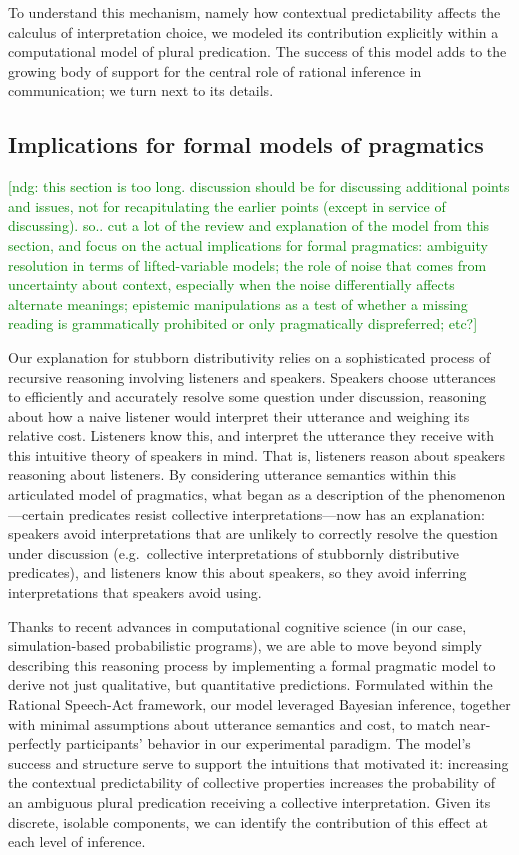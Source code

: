 \documentclass[linguex]{sp}
\newcommand{\ndg}[1]{\textcolor{Green}{[ndg: #1]}}
\begin{document}
To understand this mechanism, namely how contextual predictability affects the calculus of interpretation choice, we modeled its contribution explicitly within a computational model of plural predication. The success of this model adds to the growing body of support for the central role of rational inference in communication; we turn next to its details.

\subsection{Implications for formal models of pragmatics}

\ndg{this section is too long. discussion should be for discussing additional points and issues, not for recapitulating the earlier points (except in service of discussing). so.. cut a lot of the review and explanation of the model from this section, and focus on the actual implications for formal pragmatics: ambiguity resolution in terms of lifted-variable models; the role of noise that comes from uncertainty about context, especially when the noise differentially affects alternate meanings; epistemic manipulations as a test of whether a missing reading is grammatically prohibited or only pragmatically dispreferred; etc?}

Our explanation for stubborn distributivity relies on a sophisticated process of recursive reasoning involving listeners and speakers. Speakers choose utterances to efficiently and accurately resolve some question under discussion, reasoning about how a naive listener would interpret their utterance and weighing its relative cost. Listeners know this, and interpret the utterance they receive with this intuitive theory of speakers in mind. That is, listeners reason about speakers reasoning about listeners. By considering utterance semantics within this articulated model of pragmatics, what began as a description of the phenomenon---certain predicates resist collective interpretations---now has an explanation: speakers avoid interpretations that are unlikely to correctly resolve the question under discussion (e.g.~collective interpretations of stubbornly distributive predicates), and listeners know this about speakers, so they avoid inferring interpretations that speakers avoid using.

Thanks to recent advances in computational cognitive science (in our case, simulation-based probabilistic programs), we are able to move beyond simply describing this reasoning process by implementing a formal pragmatic model to derive not just qualitative, but quantitative predictions. Formulated within the Rational Speech-Act framework, our model leveraged Bayesian inference, together with minimal assumptions about utterance semantics and cost, to match near-perfectly participants' behavior in our experimental paradigm. The model's success and structure serve to support the intuitions that motivated it: increasing the contextual predictability of collective properties increases the probability of an ambiguous plural predication receiving a collective interpretation. Given its discrete, isolable components, we can identify the contribution of this effect at each level of inference. 
\end{document}
